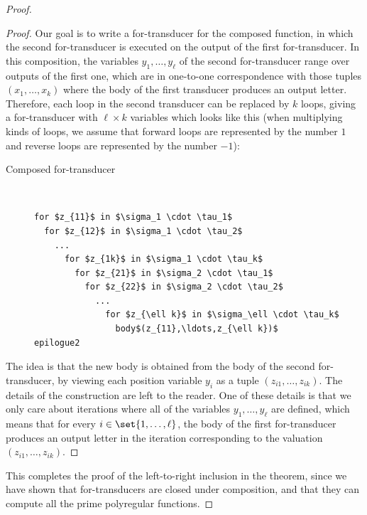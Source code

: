 \begin{proof}
\begin{proof}
Our goal is to write a for-transducer for the composed function, in which the second for-transducer is executed on the output of the first for-transducer. In this composition, the variables $y_1,\ldots,y_\ell$ of the second for-transducer range  over outputs of the first one, which are in one-to-one correspondence with those tuples $(x_1,\ldots,x_k)$ where the body of the first transducer produces an output letter. Therefore, each loop in the second transducer can be replaced by $k$ loops, giving a for-transducer with $\ell \times k$ variables 
which looks like this (when multiplying kinds of loops, we assume that forward loops are represented by the number $1$ and reverse loops are represented by the number $-1$):
\begin{description}
  \item[Composed for-transducer] \ 
                \begin{lstlisting}
for $z_{11}$ in $\sigma_1 \cdot \tau_1$
  for $z_{12}$ in $\sigma_1 \cdot \tau_2$
    ...
      for $z_{1k}$ in $\sigma_1 \cdot \tau_k$
        for $z_{21}$ in $\sigma_2 \cdot \tau_1$
          for $z_{22}$ in $\sigma_2 \cdot \tau_2$
            ...
              for $z_{\ell k}$ in $\sigma_\ell \cdot \tau_k$
                body$(z_{11},\ldots,z_{\ell k})$
epilogue2
            \end{lstlisting}
          \end{description}
  The idea is that the new body is obtained from the body of the second for-transducer, by viewing each position variable $y_i$ as a tuple $(z_{i1},\ldots,z_{ik})$. 
   The details of the construction are left to the reader. One of these details is that we only care about iterations where all of the variables $y_1,\ldots,y_\ell$ are defined, which means that for every $i \in \set{1,\ldots,\ell}$, the body of the first for-transducer produces an output letter in the iteration corresponding to the valuation $(z_{i1},\ldots,z_{ik})$. 
\end{proof}
This completes the proof of the left-to-right inclusion in the theorem, since we have shown that for-transducers are closed under composition, and that they can compute all the prime polyregular functions.


\end{proof}
